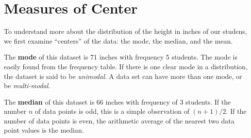 \documentclass[nohyper,justified]{tufte-handout}\usepackage[]{graphicx}\usepackage[]{color}
\begin{document}
\begin{table}[ht]
\centering
{}
\caption{Frequency Table} 
\end{table}


\section{Measures of Center}


To understand more about the distribution of the height in inches of our studens, we first examine ``centers'' of the data: the mode, the median, and the mean.

The \textbf{mode} of this dataset is 71 inches with frequency 5 students. The mode is easily found from the frequency table. If there is one clear mode in a distribution, the dataset is said to be \textit{unimodal}. A data set can have more than one mode, or be \textit{multi-modal}.

The \textbf{median} of this dataset is 66 inches with frequency of 3 students. If the number $n$ of data points is odd, this is a simple observation of $(n+1)/2$. If the number of data points is even, the arithmetic average of the nearest two data point values is the median.
\end{document}
